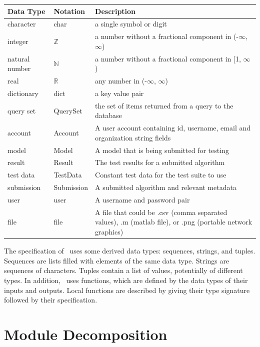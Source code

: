 \documentclass[12pt, titlepage]{article}
\begin{document}
\begin{center}
\renewcommand{\arraystretch}{1.2}
\noindent 
\begin{tabular}{l l p{7.5cm}} 
\toprule 
\textbf{Data Type} & \textbf{Notation} & \textbf{Description}\\ 
\midrule
character & char & a single symbol or digit\\
integer & $\mathbb{Z}$ & a number without a fractional component in (-$\infty$, $\infty$) \\
natural number & $\mathbb{N}$ & a number without a fractional component in [1, $\infty$) \\
real & $\mathbb{R}$ & any number in (-$\infty$, $\infty$)\\
dictionary & dict & a key value pair\\
query set & QuerySet & the set of items returned from a query to the database\\
account & Account & A user account containing id, username, email and organization string fields\\
model & Model & A model that is being submitted for testing\\
result & Result & The test results for a submitted algorithm\\
test data & TestData & Constant test data for the test suite to use\\
submission & Submission & A submitted algorithm and relevant metadata\\
user & user & A username and password pair\\
file & file & A file that could be .csv (comma separated values), .m (matlab file), or .png (portable network graphics)\\
\bottomrule
\end{tabular} 
\end{center}

\noindent
The specification of \progname \ uses some derived data types: sequences, strings, and
tuples. Sequences are lists filled with elements of the same data type. Strings
are sequences of characters. Tuples contain a list of values, potentially of
different types. In addition, \progname \ uses functions, which
are defined by the data types of their inputs and outputs. Local functions are
described by giving their type signature followed by their specification.

\section{Module Decomposition}
\end{document}
